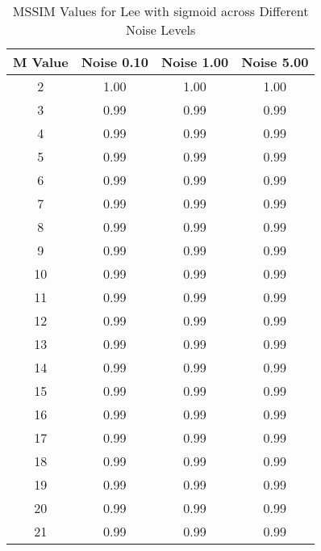 \begin{table}[htb]
\small
\centering
\begin{tabular}{|c|c|c|c|} \hline
M Value & Noise 0.10 & Noise 1.00 & Noise 5.00 \\ \hline
2 & 1.00 & 1.00 & 1.00 \\ \hline
3 & 0.99 & 0.99 & 0.99 \\ \hline
4 & 0.99 & 0.99 & 0.99 \\ \hline
5 & 0.99 & 0.99 & 0.99 \\ \hline
6 & 0.99 & 0.99 & 0.99 \\ \hline
7 & 0.99 & 0.99 & 0.99 \\ \hline
8 & 0.99 & 0.99 & 0.99 \\ \hline
9 & 0.99 & 0.99 & 0.99 \\ \hline
10 & 0.99 & 0.99 & 0.99 \\ \hline
11 & 0.99 & 0.99 & 0.99 \\ \hline
12 & 0.99 & 0.99 & 0.99 \\ \hline
13 & 0.99 & 0.99 & 0.99 \\ \hline
14 & 0.99 & 0.99 & 0.99 \\ \hline
15 & 0.99 & 0.99 & 0.99 \\ \hline
16 & 0.99 & 0.99 & 0.99 \\ \hline
17 & 0.99 & 0.99 & 0.99 \\ \hline
18 & 0.99 & 0.99 & 0.99 \\ \hline
19 & 0.99 & 0.99 & 0.99 \\ \hline
20 & 0.99 & 0.99 & 0.99 \\ \hline
21 & 0.99 & 0.99 & 0.99 \\ \hline
\end{tabular}
\caption{MSSIM Values for Lee with sigmoid across Different Noise Levels}
\end{table}

